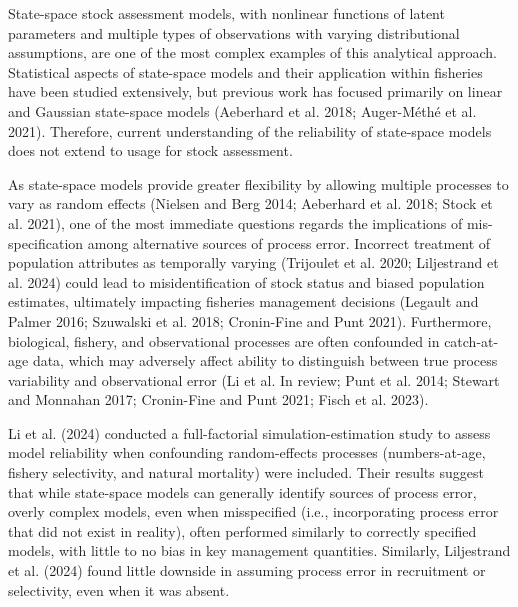 \documentclass[
  12pt,
]{article}
\providecommand{\DIFaddbegin}{} %
\providecommand{\DIFaddend}{} %
\newcommand{\DIFaddincludegraphics}[2][]{{\color{blue}\fbox{\DIFOincludegraphics[#1]{#2}}}} %
\DeclareRobustCommand{\DIFaddbegin}{\DIFOaddbegin \let\includegraphics\DIFaddincludegraphics} %
\DeclareRobustCommand{\DIFaddend}{\DIFOaddend \let\includegraphics\DIFOincludegraphics} %
\begin{document}
State-space stock assessment models, with nonlinear functions of latent
parameters and multiple types of observations with varying
distributional assumptions, are one of the most complex examples of this
analytical approach. Statistical aspects of state-space models and their
application within fisheries have been studied extensively, but previous
work has focused primarily on linear and Gaussian state-space models
(Aeberhard et al. 2018; \DIFaddbegin {\DIFaddend Auger-Méthé et al.\DIFaddbegin } \DIFaddend 2021). Therefore, current
understanding of the reliability of state-space models does not extend
to usage for stock assessment.

As state-space models provide greater flexibility by allowing multiple
processes to vary as random effects (Nielsen and Berg 2014; Aeberhard et
al. 2018; Stock et al. 2021), one of the most immediate questions
regards the implications of mis-specification among alternative sources
of process error. Incorrect treatment of population attributes as
temporally varying (Trijoulet et al. 2020; Liljestrand et al. 2024)
could lead to misidentification of stock status and biased population
estimates, ultimately impacting fisheries management decisions (Legault
and Palmer 2016; Szuwalski et al. 2018; Cronin-Fine and Punt 2021).
Furthermore, biological, fishery, and observational processes are often
confounded in catch-at-age data, which may adversely affect ability to
distinguish between true process variability and observational error (Li
et al. In review; Punt et al. 2014; Stewart and Monnahan 2017;
Cronin-Fine and Punt 2021; Fisch et al. 2023).

Li et al. (2024) conducted a full-factorial simulation-estimation study
to assess model reliability when confounding random-effects processes
(numbers-at-age, fishery selectivity, and natural mortality) were
included. Their results suggest that while state-space models can
generally identify sources of process error, overly complex models, even
when misspecified (i.e., incorporating process error that did not exist
in reality), often performed similarly to correctly specified models,
with little to no bias in key management quantities. Similarly,
Liljestrand et al. (2024) found little downside in assuming process
error in recruitment or selectivity, even when it was absent.
\end{document}
